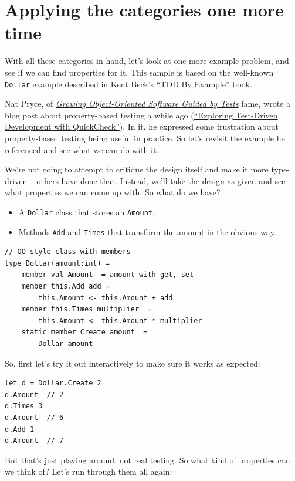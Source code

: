 \section{Applying the categories one more
time}\label{applying-the-categories-one-more-time}

With all these categories in hand, let's look at one more example
problem, and see if we can find properties for it.
This sample is based on the well-known \texttt{Dollar} example described
in Kent Beck's ``TDD By Example'' book.

Nat Pryce, of
\href{http://www.growing-object-oriented-software.com/}{\emph{Growing
Object-Oriented Software Guided by Tests}} fame, wrote a blog post about
property-based testing a while ago
(\href{http://www.natpryce.com/articles/000795.html}{``Exploring
Test-Driven Development with QuickCheck''}).
In it, he expressed some frustration about property-based testing being
useful in practice. So let's revisit the example he referenced and see
what we can do with it.

We're not going to attempt to critique the design itself and make it
more type-driven --
\href{http://spin.atomicobject.com/2014/12/10/typed-language-tdd-part2/}{others
have done that}. Instead, we'll take the design as given and see what
properties we can come up with.
So what do we have?

\begin{itemize}
\item
  A \texttt{Dollar} class that stores an \texttt{Amount}.
\item
  Methods \texttt{Add} and \texttt{Times} that transform the amount in
  the obvious way.
\end{itemize}
\begin{verbatim}
// OO style class with members
type Dollar(amount:int) =
	member val Amount  = amount with get, set
	member this.Add add = 
		this.Amount <- this.Amount + add
	member this.Times multiplier  = 
		this.Amount <- this.Amount * multiplier  
	static member Create amount  = 
		Dollar amount  
\end{verbatim}
So, first let's try it out interactively to make sure it works as
expected:

\begin{verbatim}
let d = Dollar.Create 2
d.Amount  // 2
d.Times 3 
d.Amount  // 6
d.Add 1
d.Amount  // 7
\end{verbatim}
But that's just playing around, not real testing. So what kind of
properties can we think of?
Let's run through them all again:

